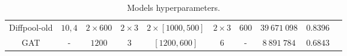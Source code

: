 \documentclass[switch, 12pt]{article}
\begin{document}
\begin{table}[H]
\begin{center}
{\begin{tabular}{|c|c|c|c|c|c|c|c|c|c|}
                Diffpool-old        & $10, 4$                  & $2 \times 600$                      & $2\times3$   & $2\times [1000, 500]$                    & $2\times 3$                           & $600$                       & $39\:671\:098$            & $0.8396$                  \\
                GAT                 & -                        & $1200$                              & $3$          & $[1200, 600]$                            & $6$                                   & -                           & $8\:891\:784$             & $0.6843$                  \\
                \midrule
            \end{tabular}
        }
    \end{center}
    \caption{Models hyperparameters.}
\end{table}
\end{document}
